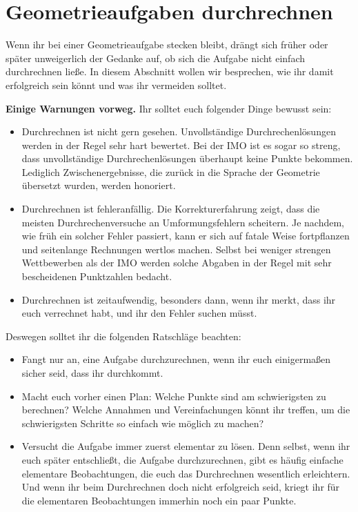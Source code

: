 \section{Geometrieaufgaben durchrechnen}\label{kapitel:Durchrechnen}
Wenn ihr bei einer Geometrieaufgabe stecken bleibt, drängt sich früher oder später unweigerlich der Gedanke auf, ob sich die Aufgabe nicht einfach durchrechnen ließe. In diesem Abschnitt wollen wir besprechen, wie ihr damit erfolgreich sein könnt und was ihr vermeiden solltet.

\textbf{Einige Warnungen vorweg.}
Ihr solltet euch folgender Dinge bewusst sein:
\begin{itemize}[label=\Warnung]
	\item Durchrechnen ist nicht gern gesehen. Unvollständige Durchrechenlösungen werden in der Regel sehr hart bewertet. Bei der IMO ist es sogar so streng, dass unvollständige Durchrechenlösungen überhaupt keine Punkte bekommen. Lediglich Zwischenergebnisse, die zurück in die Sprache der Geometrie übersetzt wurden, werden honoriert.
	\item Durchrechnen ist fehleranfällig. Die Korrekturerfahrung zeigt, dass die meisten Durchrechenversuche an Umformungsfehlern scheitern. Je nachdem, wie früh ein solcher Fehler passiert, kann er sich auf fatale Weise fortpflanzen und seitenlange Rechnungen wertlos machen. Selbst bei weniger strengen Wettbewerben als der IMO werden solche Abgaben in der Regel mit sehr bescheidenen Punktzahlen bedacht.
	\item Durchrechnen ist zeitaufwendig, besonders dann, wenn ihr merkt, dass ihr euch verrechnet habt, und ihr den Fehler suchen müsst.
\end{itemize}

Deswegen solltet ihr die folgenden Ratschläge beachten:
\begin{itemize}
	\item Fangt nur an, eine Aufgabe durchzurechnen, wenn ihr euch einigermaßen sicher seid, dass ihr durchkommt.
	\item Macht euch vorher einen Plan: Welche Punkte sind am schwierigsten zu berechnen? Welche Annahmen und Vereinfachungen könnt ihr treffen, um die schwierigsten Schritte so einfach wie möglich zu machen?
	\item Versucht die Aufgabe immer zuerst elementar zu lösen. Denn selbst, wenn ihr euch später entschließt, die Aufgabe durchzurechnen, gibt es häufig einfache elementare Beobachtungen, die euch das Durchrechnen wesentlich erleichtern. Und wenn ihr beim Durchrechnen doch nicht erfolgreich seid, kriegt ihr für die elementaren Beobachtungen immerhin noch ein paar Punkte.
\end{itemize}

